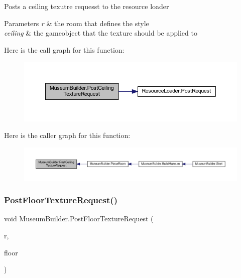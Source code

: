 Posts a ceiling texutre requesst to the resource loader 


\begin{DoxyParams}{Parameters}
{\em r} & the room that defines the style\\
\hline
{\em ceiling} & the gameobject that the texture should be applied to\\
\hline
\end{DoxyParams}
Here is the call graph for this function\+:
\nopagebreak
\begin{figure}[H]
\begin{center}
\leavevmode
\includegraphics[width=350pt]{class_museum_builder_a5b79838dee5015763177bdceca168f5c_cgraph}
\end{center}
\end{figure}
Here is the caller graph for this function\+:
\nopagebreak
\begin{figure}[H]
\begin{center}
\leavevmode
\includegraphics[width=350pt]{class_museum_builder_a5b79838dee5015763177bdceca168f5c_icgraph}
\end{center}
\end{figure}
\mbox{\label{class_museum_builder_a18b0a6f67d3e9053b604c5a7caf9d4b0}} 
\subsubsection{\texorpdfstring{Post\+Floor\+Texture\+Request()}{PostFloorTextureRequest()}}
{\footnotesize\ttfamily void Museum\+Builder.\+Post\+Floor\+Texture\+Request (\begin{DoxyParamCaption}\item[{\mbox{\hyperlink{class_room}{Room}}}]{r,  }\item[{Game\+Object}]{floor }\end{DoxyParamCaption})\hspace{0.3cm}{\ttfamily [private]}}




